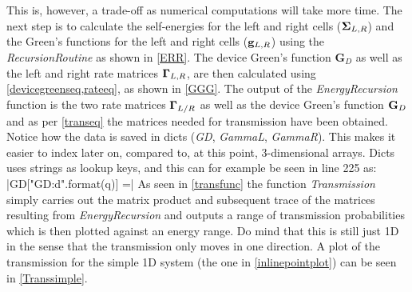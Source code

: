 \vspace{-.5\baselineskip}
\vspace{\baselineskip}
This is, however, a trade-off as numerical computations will take more time.
The next step is to calculate the self-energies for the left and right cells (\(\vb{\Sigma}_{L,R}\)) and the Green's functions for the left and right cells (\(\vb{g}_{L,R}\)) using the \textit{RecursionRoutine} as shown in \cref{ERR}.
\vspace{-.5\baselineskip}
\vspace{\baselineskip}
The device Green's function \(\textbf{G}_D\) as well as the left and right rate matrices \(\vb{\Gamma}_{L,R}\), are then calculated using \cref{devicegreenseq,rateeq}, as shown in \cref{GGG}.
\vspace{-.5\baselineskip}
\vspace{\baselineskip}
The output of the \textit{EnergyRecursion} function is the two rate matrices \(\vb{\Gamma}_{L/R}\) as well as the device Green's function \(\vb{G}_D\) and as per \cref{transeq} the matrices needed for transmission have been obtained.
Notice how the data is saved in dicts (\textit{GD}, \textit{GammaL}, \textit{GammaR}). This makes it easier to index later on, compared to, at this point, 3-dimensional arrays. Dicts uses strings as lookup keys, and this can for example be seen in line 225 as:
|GD["GD{:d}".format(q)] =|
As seen in \cref{transfunc} the function \textit{Transmission} simply carries out the matrix product and subsequent trace of the matrices resulting from \textit{EnergyRecursion} and outputs a range of transmission probabilities which is then plotted against an energy range. Do mind that this is still just 1D in the sense that the transmission only moves in one direction. A plot of the transmission for the simple 1D system (the one in \cref{inlinepointplot}) can be seen in \cref{Transsimple}.
\vspace{-.5\baselineskip}
